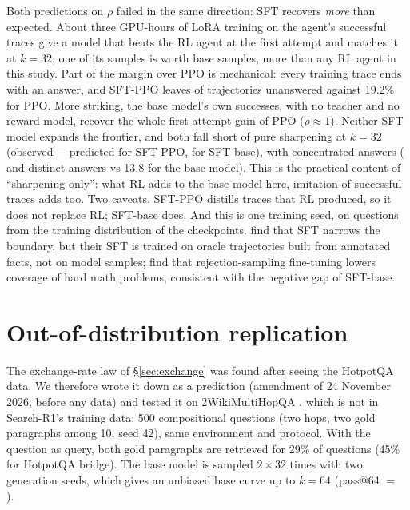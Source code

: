 \documentclass[11pt]{article}
\begin{document}
Both predictions on $\rho$ failed in the same direction: SFT recovers \emph{more} than expected. About three GPU-hours of LoRA training on the agent's successful traces give a model that beats the RL agent at the first attempt and matches it at $k = 32$; one of its samples is worth  base samples, more than any RL agent in this study. Part of the margin over PPO is mechanical: every training trace ends with an answer, and SFT-PPO leaves  of trajectories unanswered against 19.2\% for PPO. More striking, the base model's own successes, with no teacher and no reward model, recover the whole first-attempt gain of PPO ($\rho \approx 1$). Neither SFT model expands the frontier, and both fall short of pure sharpening at $k = 32$ (observed $-$ predicted   for SFT-PPO,   for SFT-base), with concentrated answers ( and  distinct answers vs 13.8 for the base model). This is the practical content of ``sharpening only'': what RL adds to the base model here, imitation of successful traces adds too. Two caveats. SFT-PPO distills traces that RL produced, so it does not replace RL; SFT-base does. And this is one training seed, on questions from the training distribution of the checkpoints. \citet{zhai2026does} find that SFT narrows the boundary, but their SFT is trained on oracle trajectories built from annotated facts, not on model samples; \citet{rath2026passk} find that rejection-sampling fine-tuning lowers coverage of hard math problems, consistent with the negative gap of SFT-base.

\section{Out-of-distribution replication}\label{sec:2wiki}

The exchange-rate law of \S\ref{sec:exchange} was found after seeing the HotpotQA data. We therefore wrote it down as a prediction (amendment of 24 November 2026, before any data) and tested it on 2WikiMultiHopQA \citep{ho2020constructing}, which is not in Search-R1's training data: 500 compositional questions (two hops, two gold paragraphs among 10, seed 42), same environment and protocol. With the question as query, both gold paragraphs are retrieved for 29\% of questions (45\% for HotpotQA bridge). The base model is sampled $2 \times 32$ times with two generation seeds, which gives an unbiased base curve up to $k = 64$ (pass@64 $=$ ).
\end{document}
